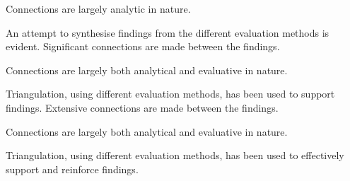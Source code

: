 \documentclass{../../fal_assignment}
\begin{document}
\begin{markingrubric}
        \par     		Connections are largely analytic in nature.
        \par		An attempt to synthesise findings from the different evaluation methods is evident.
        \grade		Significant connections are made between the findings.
        \par		Connections are largely both analytical and evaluative in nature.
        \par		Triangulation, using different evaluation methods, has been used to support findings.
        \grade		Extensive connections are made between the findings.
        \par		Connections are largely both analytical and evaluative in nature.
        \par		Triangulation, using different evaluation methods, has been used to effectively support and reinforce findings.


\end{markingrubric}
\end{document}
